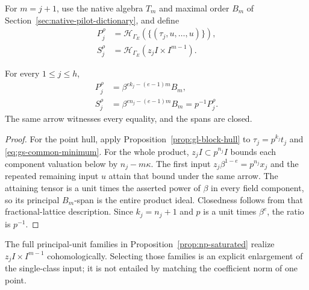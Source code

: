 For $m=j+1$, use the native algebra $T_m$ and maximal order $B_m$
of Section~\ref{sec:native-pilot-dictionary}, and define
\[
 \begin{aligned}
 P_j^\rho&=\mathcal H_{\Gamma_E}
                   (\{(\tau_j,u,\ldots,u)\}),\\
 S_j^\rho&=\mathcal H_{\Gamma_E}(z_jI\times I^{m-1}).
 \end{aligned}
\]
\begin{corollary}\label{cor:gs-hulls}
For every $1\le j\le h$,
\begin{equation}\label{eq:gs-hulls}
 \begin{aligned}
 P_j^\rho&=\beta^{e k_j-(e-1)m}B_m,\\
 S_j^\rho&=\beta^{e n_j-(e-1)m}B_m=p^{-1}P_j^\rho.
 \end{aligned}
\end{equation}
The same arrow witnesses every equality, and the spans are closed.
\end{corollary}
\begin{proof}
For the point hull, apply Proposition~\ref{prop:gl-block-hull} to
$\tau_j=p^{k_j}t_j$ and \eqref{eq:gs-common-minimum}.
For the whole product, $z_jI\subset p^{n_j}I$ bounds each component
valuation below by $n_j-m\kappa$. The first input
$z_j\beta^{1-e}=p^{n_j}x_j$ and the repeated remaining input $u$
attain that bound under the same arrow. The attaining tensor is a
unit times the asserted power of $\beta$ in every field component,
so its principal $B_m$-span is the entire product ideal. Closedness
follows from that fractional-lattice description. Since
$k_j=n_j+1$ and $p$ is a unit times $\beta^e$, the ratio is $p^{-1}$.
\end{proof}

The full principal-unit families in Proposition~\ref{prop:np-saturated}
realize $z_jI\times I^{m-1}$ cohomologically. Selecting those families
is an explicit enlargement of the single-class input; it is not
entailed by matching the coefficient norm of one point.

